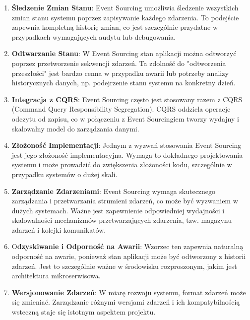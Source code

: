 \begin{enumerate}

    \item \textbf{Śledzenie Zmian Stanu}: Event Sourcing umożliwia śledzenie wszystkich zmian stanu systemu poprzez zapisywanie każdego zdarzenia. To podejście zapewnia kompletną historię zmian, co jest szczególnie przydatne w przypadkach wymagających audytu lub debugowania.

    \item \textbf{Odtwarzanie Stanu}: W Event Sourcing stan aplikacji można odtworzyć poprzez przetworzenie sekwencji zdarzeń. Ta zdolność do "odtworzenia przeszłości" jest bardzo cenna w przypadku awarii lub potrzeby analizy historycznych danych, np. podejrzenie stanu systemu na konkretny dzień.

    \item \textbf{Integracja z CQRS}: Event Sourcing często jest stosowany razem z CQRS (Command Query Responsibility Segregation). CQRS oddziela operacje odczytu od zapisu, co w połączeniu z Event Sourcingiem tworzy wydajny i skalowalny model do zarządzania danymi.

    \item \textbf{Złożoność Implementacji}: Jednym z wyzwań stosowania Event Sourcing jest jego złożoność implementacyjna. Wymaga to dokładnego projektowania systemu i może prowadzić do zwiększenia złożoności kodu, szczególnie w przypadku systemów o dużej skali.

    \item \textbf{Zarządzanie Zdarzeniami}: Event Sourcing wymaga skutecznego zarządzania i przetwarzania strumieni zdarzeń, co może być wyzwaniem w dużych systemach. Ważne jest zapewnienie odpowiedniej wydajności i skalowalności mechanizmów przetwarzających zdarzenia, tzw. magazynu zdarzeń i kolejki komunikatów.

    \item O\textbf{dzyskiwanie i Odporność na Awarii}: Wzorzec ten zapewnia naturalną odporność na awarie, ponieważ stan aplikacji może być odtworzony z historii zdarzeń. Jest to szczególnie ważne w środowisku rozproszonym, jakim jest architektura mikroserwisowa.

    \item \textbf{Wersjonowanie Zdarzeń}: W miarę rozwoju systemu, format zdarzeń może się zmieniać. Zarządzanie różnymi wersjami zdarzeń i ich kompatybilnością wsteczną staje się istotnym aspektem projektu.

\end{enumerate}

